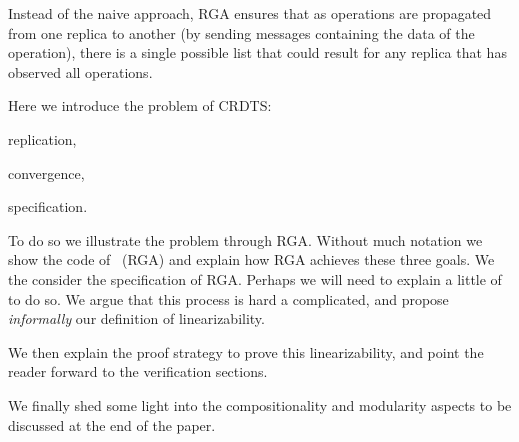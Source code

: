 {
Instead of the naive approach, RGA ensures that as operations are
propagated from one replica to another (by sending messages containing
the data of the operation), there is a single possible list that could
result for any replica that has observed all operations.
}


Here we introduce the problem of CRDTS:
\begin{inparaenum}
\item replication,
\item convergence,
\item specification.
\end{inparaenum}
To do so we illustrate the problem through RGA. Without much notation
we show the code of~\cite{ShapiroPBZ11} (RGA) and explain how RGA achieves
these three goals.
%
We the consider the specification of RGA. Perhaps we will need to
explain a little of~\cite{BurckhardtGYZ14} to do so.
%
We argue that this process is hard a complicated, and propose
\emph{informally} our definition of linearizability.

We then explain the proof strategy to prove this linearizability, and
point the reader forward to the verification sections.

We finally shed some light into the compositionality and modularity
aspects to be discussed at the end of the paper.


